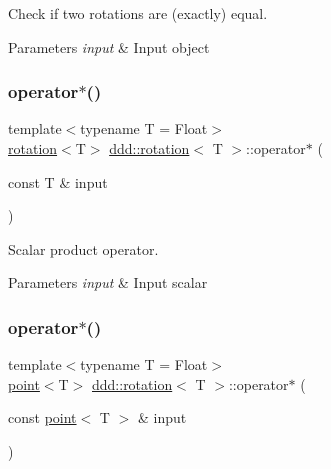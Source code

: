 Check if two rotations are (exactly) equal. 


\begin{DoxyParams}{Parameters}
{\em input} & Input object \\
\hline
\end{DoxyParams}
\mbox{\label{classddd_1_1rotation_aada9691ca7067feefd0a0206f8c8d035}} 
\subsubsection{\texorpdfstring{operator$\ast$()}{operator*()}\hspace{0.1cm}{\footnotesize\ttfamily [1/4]}}
{\footnotesize\ttfamily template$<$typename T  = Float$>$ \\
\hyperlink{classddd_1_1rotation}{rotation}$<$T$>$ \hyperlink{classddd_1_1rotation}{ddd\+::rotation}$<$ T $>$\+::operator$\ast$ (\begin{DoxyParamCaption}\item[{const T \&}]{input }\end{DoxyParamCaption})\hspace{0.3cm}{\ttfamily [inline]}}



Scalar product operator. 


\begin{DoxyParams}{Parameters}
{\em input} & Input scalar \\
\hline
\end{DoxyParams}
\mbox{\label{classddd_1_1rotation_a5761f38de833fde1a6c299ba1e1dc844}} 
\subsubsection{\texorpdfstring{operator$\ast$()}{operator*()}\hspace{0.1cm}{\footnotesize\ttfamily [2/4]}}
{\footnotesize\ttfamily template$<$typename T  = Float$>$ \\
\hyperlink{classddd_1_1point}{point}$<$T$>$ \hyperlink{classddd_1_1rotation}{ddd\+::rotation}$<$ T $>$\+::operator$\ast$ (\begin{DoxyParamCaption}\item[{const \hyperlink{classddd_1_1point}{point}$<$ T $>$ \&}]{input }\end{DoxyParamCaption})\hspace{0.3cm}{\ttfamily [inline]}}



